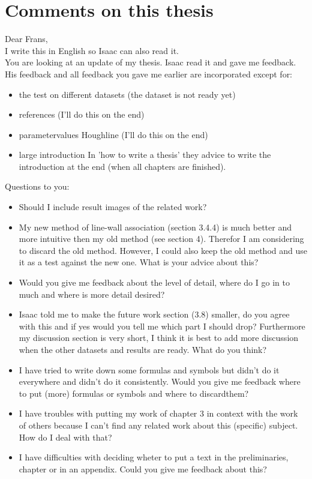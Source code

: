 \section{Comments on this thesis}
Dear Frans,\\

I write this in English so Isaac can also read it.\\
You are looking at an update of my thesis. Isaac read it and gave me feedback. His feedback and all feedback you gave me earlier are incorporated except for:\\
\begin{itemize}
\item the test on different datasets
(the dataset is not ready yet)
\item references
(I'll do this on the end)
\item parametervalues Houghline
(I'll do this on the end)
\item large introduction
In 'how to write a thesis' they advice to write the introduction at the end (when all chapters are finished).
\end{itemize}

Questions to you:\\
\begin{itemize}
\item Should I include result images of the related work?
\item My new method of line-wall association (section 3.4.4) is much better and
more intuitive then my old method (see section 4). Therefor I am considering to discard the old method. However, I could also keep the old method and use it as
a test against the new one. What is your advice about this?\\
\item Would you give me feedback about the level of detail, where do I go in to much and where is more detail desired?\\
\item Isaac told me to make the future work section (3.8) smaller, do you agree with this and if yes would you tell me which part I should drop?
Furthermore my discussion section is very short, I think it is best to add more discussion when the other datasets and results are ready. What do you think?\\
\item I have tried to write down some formulas and symbols but didn't do it everywhere and didn't do it consistently. Would you give me feedback where to put (more) formulas or symbols and where to discardthem?\\
\item I have troubles with putting my work of chapter 3 in context with the work of others because I can't find any related work about this (specific) subject.  How do I deal with that?\\
\item I have difficulties with deciding wheter to put a text in the preliminaries, chapter or in an appendix. Could you give me feedback about this?
\end{itemize}

